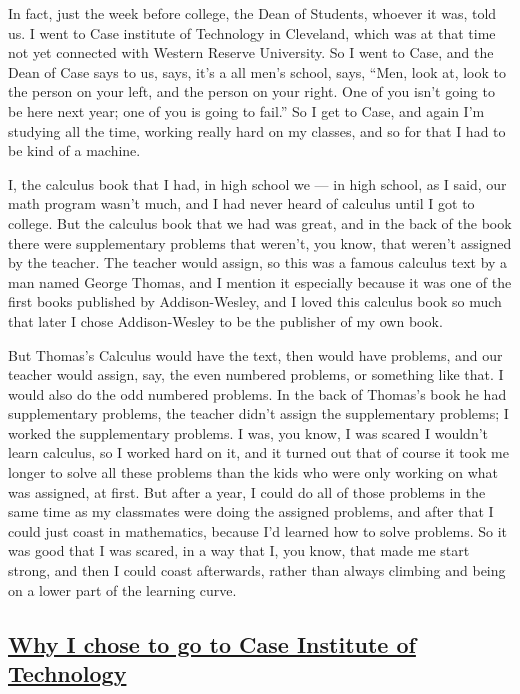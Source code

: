 \documentclass[]{article}
\begin{document}
In fact, just the week before college, the Dean of Students, whoever it
was, told us. I went to Case institute of Technology in Cleveland, which
was at that time not yet connected with Western Reserve University. So I
went to Case, and the Dean of Case says to us, says, it's a all men's
school, says, ``Men, look at, look to the person on your left, and the
person on your right. One of you isn't going to be here next year; one
of you is going to fail.'' So I get to Case, and again I'm studying all
the time, working really hard on my classes, and so for that I had to be
kind of a machine.

I, the calculus book that I had, in high school we --- in high school,
as I said, our math program wasn't much, and I had never heard of
calculus until I got to college. But the calculus book that we had was
great, and in the back of the book there were supplementary problems
that weren't, you know, that weren't assigned by the teacher. The
teacher would assign, so this was a famous calculus text by a man named
George Thomas, and I mention it especially because it was one of the
first books published by Addison-Wesley, and I loved this calculus book
so much that later I chose Addison-Wesley to be the publisher of my own
book.

But Thomas's Calculus would have the text, then would have problems, and
our teacher would assign, say, the even numbered problems, or something
like that. I would also do the odd numbered problems. In the back of
Thomas's book he had supplementary problems, the teacher didn't assign
the supplementary problems; I worked the supplementary problems. I was,
you know, I was scared I wouldn't learn calculus, so I worked hard on
it, and it turned out that of course it took me longer to solve all
these problems than the kids who were only working on what was assigned,
at first. But after a year, I could do all of those problems in the same
time as my classmates were doing the assigned problems, and after that I
could just coast in mathematics, because I'd learned how to solve
problems. So it was good that I was scared, in a way that I, you know,
that made me start strong, and then I could coast afterwards, rather
than always climbing and being on a lower part of the learning curve.

\subsection{\texorpdfstring{\href{http://webofstories.com/play/17069}{Why
I chose to go to Case Institute of
Technology}}{Why I chose to go to Case Institute of Technology}}\label{why-i-chose-to-go-to-case-institute-of-technology}
\end{document}
